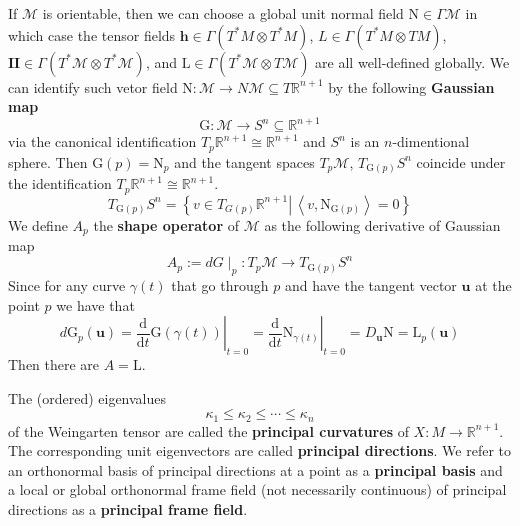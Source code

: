 If $\mathcal{M}$ is orientable, then we can choose a global unit normal field $\mathrm{N}\in\Gamma \mathcal{M}$ in which case the tensor fields $\boldsymbol{h}\in\Gamma(T^*M\otimes T^*M)$, $L\in\Gamma(T^*M\otimes TM)$, $\mathbf{II}\in\Gamma(T^*\mathcal{M}\otimes T^*\mathcal{M})$, and $\mathrm{L}\in\Gamma(T^*\mathcal{M}\otimes T\mathcal{M})$ are all well-defined globally. We can identify such vetor field $\mathrm{N}:\mathcal{M}\to N\mathcal{M}\subseteq T\mathbb{R}^{n+1}$ by the following \textbf{Gaussian map}
\begin{equation*}
    \mathrm{G}:\mathcal{M}\to S^n\subseteq\mathbb{R}^{n+1}
\end{equation*}
via the canonical identification $T_p\mathbb{R}^{n+1}\cong\mathbb{R}^{n+1}$ and $S^n$ is an $n$-dimentional sphere. Then $\mathrm{G}(p)=\mathrm{N}_p$ and the tangent spaces $T_p\mathcal{M}$, $T_{\mathrm{G}(p)}S^n$ coincide under the identification $T_p\mathbb{R}^{n+1}\cong\mathbb{R}^{n+1}$.
\begin{equation*}
    T_{\mathrm{G}(p)}S^n=\left\{v\in T_{G(p)}\mathbb{R}^{n+1}\left|\,\left<v,\mathrm{N}_{\mathrm{G}(p)}\right>=0\right.\right\}
\end{equation*}
We define $A_p$ the \textbf{shape operator} of $\mathcal{M}$ as the following derivative of Gaussian map
\begin{equation*}
    A_p:=dG\mid_p:T_p\mathcal{M}\to T_{\mathrm{G}(p)}S^n
\end{equation*}
Since for any curve $\gamma(t)$ that go through $p$ and have the tangent vector $\boldsymbol{u}$ at the point $p$ we have that
\begin{equation*}
    d\mathrm{G}_p(\boldsymbol{u})=\left.\frac{\mathrm{d}}{\mathrm{d}t}\mathrm{G}(\gamma(t))\right|_{t=0}=\left.\frac{\mathrm{d}}{\mathrm{d}t} {\mathrm{N}}_{\gamma(t)}\right|_{t=0}=D_{\boldsymbol{u}}\mathrm{N}=\mathrm{L}_{p}(\boldsymbol{u})
\end{equation*}
Then there are $A=\mathrm{L}$.

\begin{definition}\label{def:Principal Curvature}
    The (ordered) eigenvalues
    \begin{equation}
        \kappa_1\le \kappa_2\le\cdots\le\kappa_n
    \end{equation}
    of the Weingarten tensor are called the \textbf{principal curvatures} of $X:M\to\mathbb{R}^{n+1}$. The corresponding unit eigenvectors are called \textbf{principal directions}. We refer to an orthonormal basis
of principal directions at a point as a \textbf{principal basis} and a local or global orthonormal frame field (not necessarily continuous) of principal directions as a \textbf{principal frame field}.
\end{definition}

